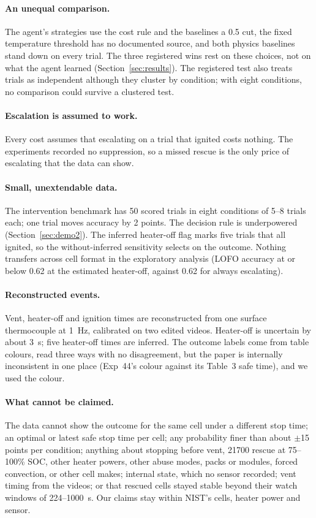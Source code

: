 \documentclass[11pt]{article}
\begin{document}
\paragraph{An unequal comparison.} The agent's strategies use the cost rule and the baselines a 0.5 cut, the fixed
temperature threshold has no documented source, and both physics baselines stand down on every trial. The three
registered wins rest on these choices, not on what the agent learned (Section~\ref{sec:results}). The registered test
also treats trials as independent although they cluster by condition; with eight conditions, no comparison could
survive a clustered test.

\paragraph{Escalation is assumed to work.} Every cost assumes that escalating on a trial that ignited costs nothing.
The experiments recorded no suppression, so a missed rescue is the only price of escalating that the data can show.

\paragraph{Small, unextendable data.} The intervention benchmark has 50 scored trials in eight conditions of 5--8
trials each; one trial moves accuracy by 2 points. The decision rule is underpowered (Section~\ref{sec:demo2}). The
inferred heater-off flag marks five trials that all ignited, so the without-inferred sensitivity selects on the
outcome.
Nothing transfers across cell format in the exploratory analysis (LOFO accuracy at or below 0.62 at the estimated
heater-off, against 0.62 for always escalating).

\paragraph{Reconstructed events.} Vent, heater-off and ignition times are reconstructed from one surface thermocouple
at 1~Hz, calibrated on two edited videos. Heater-off is uncertain by about 3~s; five heater-off times are inferred.
The outcome labels come from table colours, read three ways with no disagreement, but the paper is internally
inconsistent in one place (Exp~44's colour against its Table~3 safe time), and we used the colour.

\paragraph{What cannot be claimed.} The data cannot show the outcome for the same cell under a different stop time; an
optimal or latest safe stop time per cell; any probability finer than about $\pm$15 points per condition; anything
about stopping before vent, 21700 rescue at 75--100\% SOC, other heater powers, other abuse modes, packs or modules,
forced convection, or other cell makes; internal state, which no sensor recorded; vent timing from the videos; or that
rescued cells stayed stable beyond their watch windows of 224--1000~s. Our claims stay within NIST's cells, heater
power and sensor.
\end{document}
